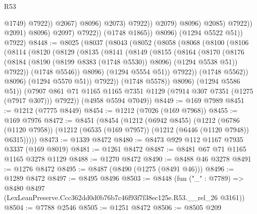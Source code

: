 \begin{lexlean}{R53}
\begin{coremodule}
                                                @1749)
                                              @7922))
                                          @2067)
                                        @8096)
                                      @2073)
                                    @7922))
                                @2079)
                              @8096)
                            @2085)
                          @7922))
                      @2091)
                    @8096)
                  @2097)
                @7922))
            (@1748 @1865))
          @8096)
        (@1294 @5522 @51))
      @7922)
@8448 := @8025
    (@8037
      (@8043
        (@8052
          (@8058
            (@8068
              (@8100
                (@8106
                  (@8114
                    (@8120
                      (@8129
                        (@8135
                          (@8141
                            (@8149
                              (@8155
                                (@8164
                                  (@8170
                                    (@8176
                                      (@8184
                                        (@8190 (@8199 @8383 (@1748 @5530)) @8096)
                                        (@1294 @5538 @51))
                                      @7922))
                                  (@1748 @5546))
                                @8096)
                              (@1294 @5554 @51))
                            @7922))
                        (@1748 @5562))
                      @8096)
                    (@1294 @5570 @51))
                  @7922))
              (@1748 @5578))
            @8096)
          (@1294 @5586 @51))
        (@7907 @861 @71 @1165 @1165 @7351 @1129 (@7914 @307 @7351 (@1275 (@7917 @307))) @7922))
      (@4958 @5594 @7049))
@8449 := @169 @7989
@8451 := @1212 (@7775 @8449)
@8454 := @1212 (@7026 (@169 @7968))
@8455 := @169 @7976
@8472 := @8451
    (@8454
      (@1212
        (@6942 @8455)
        (@1212
          (@6786 (@1120 @7958))
          (@1212 (@6535 (@169 @7957)) (@1212 (@6446 (@1120 @7948)) @6315)))))
@8473 := @1339 @8472
@8480 := @8473 @929 @112 @1167 @7935 @3337 (@169 @8019)
@8481 := @1261 @8472
@8487 := @8481 @67 @71 @1165 @1165 @3278 @1129
@8488 := @1270 @8472
@8490 := @8488 @46 @3278
@8491 := @1276 @8472
@8495 := @8487 (@8490 (@1275 (@8491 @46)))
@8496 := @1289 @8472
@8497 := @8495 @8496
@8503 := @8448
    (fun ("_" : @7789) =>
    @8480 @8497 (LexLeanPreserve.Ccc362dd0d0b76b7c46f93f7f38ec125e.R53.__rel_26 @3161))
@8504 := @7788 @2546
@8505 := @1251 @8472
@8506 := @8505 @209

\end{coremodule}
\end{lexlean}
